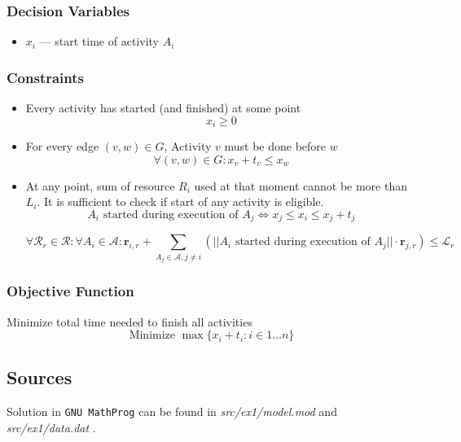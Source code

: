 \subsubsection*{Decision Variables}
\begin{itemize}
    \item $x_i$ --- start time of activity $A_i$
\end{itemize}
\subsubsection*{Constraints}
\begin{itemize}
    \item Every activity has started (and finished) at some point 
    $$x_i \geqslant 0$$
    \item For every edge $(v,w) \in G$, Activity $v$ must be done before $w$
    $$\forall (v,w) \in G : x_v + t_v \leqslant x_w$$
    \item At any point, sum of resource $R_i$ used at that moment cannot be more than $L_i$. It is sufficient to check if start of any activity is eligible.
    $$ A_i \textrm{ started during execution of } A_j \iff x_j \leq x_i \leq x_j + t_j$$
    
    $$
    \forall \mathcal{R}_r \in \mathcal{R} : 
        \forall A_i \in \mathcal{A} : 
            \textbf{r}_{i, r} + 
            \sum_{A_j \in \mathcal{A}, j \neq i}
                ( ||A_i \textrm{ started during execution of } A_j|| \cdot \textbf{r}_{j, r} ) \leq \mathcal{L}_r 
    $$

\end{itemize}
\subsubsection*{Objective Function}
Minimize total time needed to finish all activities
$$\textrm{Minimize } \max\{ x_i + t_i : i \in 1 \dots n \}$$
\subsection{Sources}
Solution in \texttt{GNU MathProg} can be found in \textit{src/ex1/model.mod} and \textit{src/ex1/data.dat} .

